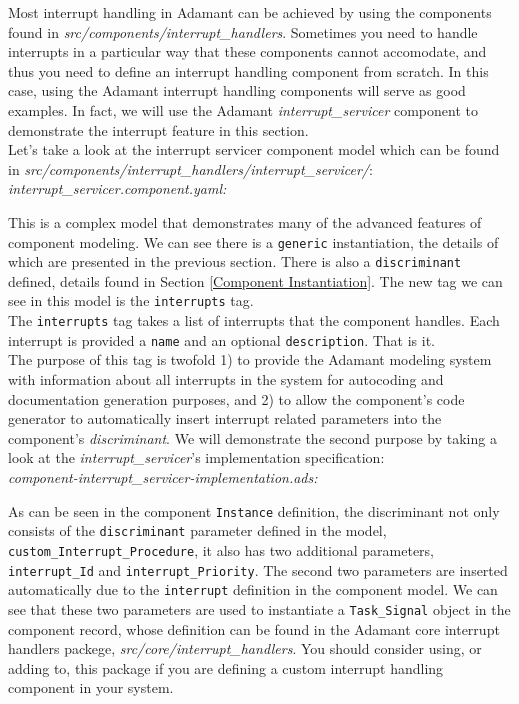 Most interrupt handling in Adamant can be achieved by using the components found in \textit{src/components/interrupt\_handlers}. Sometimes you need to handle interrupts in a particular way that these components cannot accomodate, and thus you need to define an interrupt handling component from scratch. In this case, using the Adamant interrupt handling components will serve as good examples. In fact, we will use the Adamant \textit{interrupt\_servicer} component to demonstrate the interrupt feature in this section. \\

Let's take a look at the interrupt servicer component model which can be found in \textit{src/components/interrupt\_handlers/interrupt\_servicer/}: \\

\textit{interrupt\_servicer.component.yaml:} 

This is a complex model that demonstrates many of the advanced features of component modeling. We can see there is a \texttt{generic} instantiation, the details of which are presented in the previous section. There is also a \texttt{discriminant} defined, details found in Section \ref{Component Instantiation}. The new tag we can see in this model is the \texttt{interrupts} tag. \\

The \texttt{interrupts} tag takes a list of interrupts that the component handles. Each interrupt is provided a \texttt{name} and an optional \texttt{description}. That is it. \\

The purpose of this tag is twofold 1) to provide the Adamant modeling system with information about all interrupts in the system for autocoding and documentation generation purposes, and 2) to allow the component's code generator to automatically insert interrupt related parameters into the component's \textit{discriminant}. We will demonstrate the second purpose by taking a look at the \textit{interrupt\_servicer}'s implementation specification: \\

\textit{component-interrupt\_servicer-implementation.ads:} 

As can be seen in the component \texttt{Instance} definition, the discriminant not only consists of the \texttt{discriminant} parameter defined in the model, \texttt{custom\_Interrupt\_Procedure}, it also has two additional parameters, \texttt{interrupt\_Id} and \texttt{interrupt\_Priority}. The second two parameters are inserted automatically due to the \texttt{interrupt} definition in the component model. We can see that these two parameters are used to instantiate a \texttt{Task\_Signal} object in the component record, whose definition can be found in the Adamant core interrupt handlers packege, \textit{src/core/interrupt\_handlers}. You should consider using, or adding to, this package if you are defining a custom interrupt handling component in your system. \\

